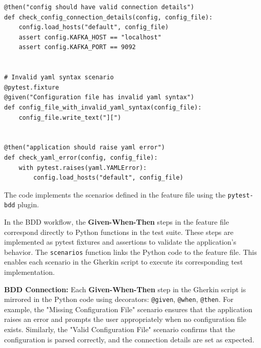 \documentclass[10pt , a4paper]{report}
\newenvironment{code}{\captionsetup{type=listing}}{}
\begin{document}
\begin{code}
\begin{verbatim}
@then("config should have valid connection details")
def check_config_connection_details(config, config_file):
    config.load_hosts("default", config_file)
    assert config.KAFKA_HOST == "localhost"
    assert config.KAFKA_PORT == 9092


# Invalid yaml syntax scenario
@pytest.fixture
@given("Configuration file has invalid yaml syntax")
def config_file_with_invalid_yaml_syntax(config_file):
    config_file.write_text("][")


@then("application should raise yaml error")
def check_yaml_error(config, config_file):
    with pytest.raises(yaml.YAMLError):
        config.load_hosts("default", config_file)
  \end{verbatim}
\end{code}

The code implements the scenarios defined in the feature file using the \texttt{pytest-bdd} plugin. 

In the BDD workflow, the \textbf{Given-When-Then} steps in the feature file correspond directly to Python functions in the test suite. These steps are implemented as pytest fixtures and assertions to validate the application's behavior.
The \texttt{scenarios} function links the Python code to the feature file. This enables each scenario in the Gherkin script to execute its corresponding test implementation.

\textbf{BDD Connection:}
Each \textbf{Given-When-Then} step in the Gherkin script is mirrored in the Python code using decorators: \texttt{@given}, \texttt{@when}, \texttt{@then}. For example, the "Missing Configuration File" scenario ensures that the application raises an error and prompts the user appropriately when no configuration file exists. Similarly, the "Valid Configuration File" scenario confirms that the configuration is parsed correctly, and the connection details are set as expected.


\appendix
\end{document}
